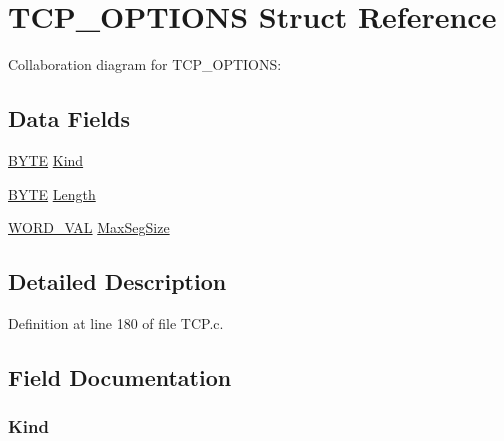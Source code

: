 \hypertarget{struct_t_c_p___o_p_t_i_o_n_s}{}\section{T\+C\+P\+\_\+\+O\+P\+T\+I\+O\+N\+S Struct Reference}
\label{struct_t_c_p___o_p_t_i_o_n_s}


Collaboration diagram for T\+C\+P\+\_\+\+O\+P\+T\+I\+O\+N\+S\+:
\subsection*{Data Fields}
\begin{DoxyCompactItemize}
\item 
\hyperlink{_generic_type_defs_8h_a4ae1dab0fb4b072a66584546209e7d58}{B\+Y\+T\+E} \hyperlink{struct_t_c_p___o_p_t_i_o_n_s_a7c46116cbd9a8db99e5d33283345e524}{Kind}
\item 
\hyperlink{_generic_type_defs_8h_a4ae1dab0fb4b072a66584546209e7d58}{B\+Y\+T\+E} \hyperlink{struct_t_c_p___o_p_t_i_o_n_s_ae875c7698e130ba8324b8746c3ef7a11}{Length}
\item 
\hyperlink{union_w_o_r_d___v_a_l}{W\+O\+R\+D\+\_\+\+V\+A\+L} \hyperlink{struct_t_c_p___o_p_t_i_o_n_s_a4414eab3a6c9ce2fa592d8917a143515}{Max\+Seg\+Size}
\end{DoxyCompactItemize}


\subsection{Detailed Description}


Definition at line 180 of file T\+C\+P.\+c.



\subsection{Field Documentation}
\hypertarget{struct_t_c_p___o_p_t_i_o_n_s_a7c46116cbd9a8db99e5d33283345e524}{}
\subsubsection[{Kind}]{ Kind}\label{struct_t_c_p___o_p_t_i_o_n_s_a7c46116cbd9a8db99e5d33283345e524}


